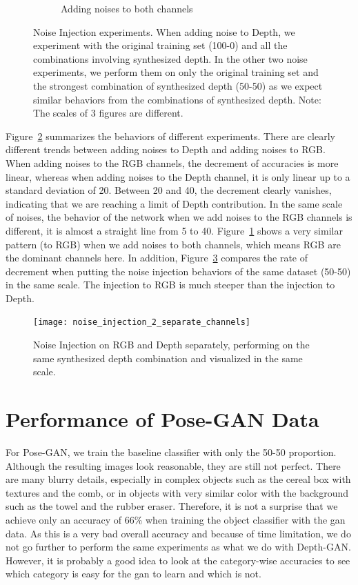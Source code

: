 \begin{figure}[h!]
\begin{subfigure}{0.32\textwidth}
		\caption{Adding noises to both channels}
		\label{subfig:noise_both}
	\end{subfigure}
	\caption{Noise Injection experiments. When adding noise to Depth, we experiment with
	the original training set (100-0) and all the combinations involving synthesized
depth. In the other two noise experiments, we perform them on only the original training
set and the strongest combination of synthesized depth (50-50) as we expect similar
behaviors from the combinations of synthesized depth. Note: The scales of 3 figures are
different.}
	\label{fig:noise_injection}
\end{figure}

Figure~\ref{fig:noise_injection} summarizes the behaviors of different experiments. There
are clearly different trends between adding noises to Depth and adding noises to RGB. When
adding noises to the RGB channels, the decrement of accuracies is more linear, whereas
when adding noises to the Depth channel, it is only linear up to a standard deviation of
20. Between 20 and 40, the decrement clearly vanishes, indicating that we are reaching a
limit of Depth contribution. In the same scale of noises, the behavior of the network when
we add noises to the RGB channels is different, it is almost a straight line from 5 to 40.
Figure~\ref{subfig:noise_both} shows a very similar pattern (to RGB) when we add noises to
both channels, which means RGB are the dominant channels here. In addition,
Figure~\ref{fig:noise_injection_2_channels} compares the rate of decrement when putting
the noise injection behaviors of the same dataset (50-50) in the same scale. The injection
to RGB is much steeper than the injection to Depth.

\begin{figure}[h!]
	\centering
	\texttt{[image: noise\_injection\_2\_separate\_channels]}
	\caption{Noise Injection on RGB and Depth separately, performing on the same
	synthesized depth combination and visualized in the same scale.}
	\label{fig:noise_injection_2_channels}
\end{figure}

\section{Performance of Pose-GAN Data}

For Pose-GAN, we train the baseline classifier with only the 50-50 proportion. Although
the resulting images look reasonable, they are still not perfect. There are many blurry
details, especially in complex objects such as the cereal box with textures and the comb,
or in objects with very similar color with the background such as the towel and the rubber
eraser. Therefore, it is not a surprise that we achieve only an accuracy of 66\% when
training the object classifier with the \acrshort{gan} data. As this is a very bad overall
accuracy and because of time limitation, we do not go further to perform the same
experiments as what we do with Depth-GAN. However, it is probably a good idea to look at
the category-wise accuracies to see which category is easy for the \acrshort{gan} to learn
and which is not.

